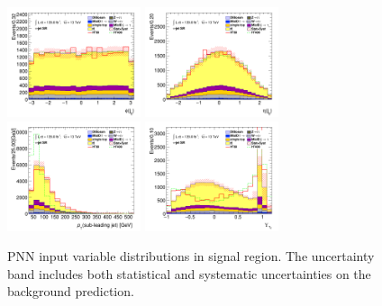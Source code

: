 		\begin{figure}[!htp]
			\begin{center}    
			\includegraphics[width=0.35\textwidth]{chapters/chapter6_HPlus/images/taujets/jet_0_phi_SR_TAUJET.png}
			\includegraphics[width=0.35\textwidth]{chapters/chapter6_HPlus/images/taujets/jet_0_eta_SR_TAUJET.png} \\
			\includegraphics[width=0.35\textwidth]{chapters/chapter6_HPlus/images/taujets/jet_1_pt_SR_TAUJET.png}
			\includegraphics[width=0.35\textwidth]{chapters/chapter6_HPlus/images/taujets/tau_0_upsilon_SR_TAUJET.png} \\
			\end{center}
			\caption{
			PNN input variable distributions in \taujets signal region. The uncertainty band includes both statistical and systematic uncertainties on the background prediction. 
			}
			\label{fig:sr-taujets-3}
		\end{figure}

